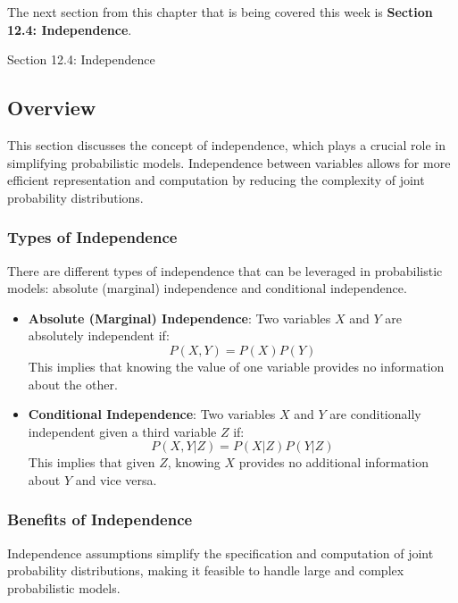 The next section from this chapter that is being covered this week is \textbf{Section 12.4: Independence}.

\begin{notes}{Section 12.4: Independence}
    \subsection*{Overview}

    This section discusses the concept of independence, which plays a crucial role in simplifying probabilistic models. Independence between variables allows for more efficient representation and 
    computation by reducing the complexity of joint probability distributions.
    
    \subsubsection*{Types of Independence}
    
    There are different types of independence that can be leveraged in probabilistic models: absolute (marginal) independence and conditional independence.
    
    \begin{highlight}
    
        \begin{itemize}
            \item \textbf{Absolute (Marginal) Independence}: Two variables $X$ and $Y$ are absolutely independent if:
            \[
            P(X, Y) = P(X)P(Y)
            \]
            This implies that knowing the value of one variable provides no information about the other.
            \item \textbf{Conditional Independence}: Two variables $X$ and $Y$ are conditionally independent given a third variable $Z$ if:
            \[
            P(X, Y | Z) = P(X | Z)P(Y | Z)
            \]
            This implies that given $Z$, knowing $X$ provides no additional information about $Y$ and vice versa.
        \end{itemize}
    
    \end{highlight}
    
    \subsubsection*{Benefits of Independence}
    
    Independence assumptions simplify the specification and computation of joint probability distributions, making it feasible to handle large and complex probabilistic models.
    

\end{notes}

